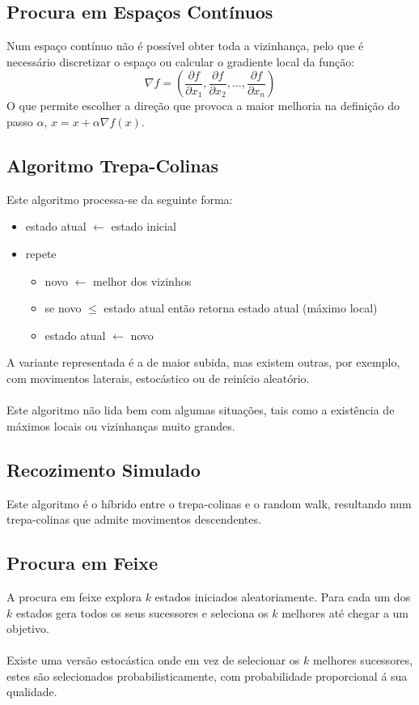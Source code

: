 \documentclass[10pt,a4paper]{report}
\begin{document}
\subsection{Procura em Espaços Contínuos}
Num espaço contínuo não é possível obter toda a vizinhança, pelo que é necessário discretizar o espaço ou calcular o gradiente local da função:
$$
\nabla f = \left( \frac{\partial f}{\partial x_1}, \frac{\partial f}{\partial x_2}, ..., \frac{\partial f}{\partial x_n} \right)
$$
O que permite escolher a direção que provoca a maior melhoria na definição do passo $\alpha$, $x = x + \alpha \nabla f (x)$.
\subsection{Algoritmo Trepa-Colinas}
Este algoritmo processa-se da seguinte forma:
\begin{itemize}
\item estado atual $\leftarrow$ estado inicial
\item repete
\begin{itemize}
\item novo $\leftarrow$ melhor dos vizinhos
\item se novo $\leq$ estado atual então retorna estado atual (máximo local)
\item estado atual $\leftarrow$ novo
\end{itemize}
\end{itemize}
A variante representada é a de maior subida, mas existem outras, por exemplo, com movimentos laterais, estocástico ou de reinício aleatório.\\
\\
Este algoritmo não lida bem com algumas situações, tais como a existência de máximos locais ou vizinhanças muito grandes.
\subsection{Recozimento Simulado}
Este algoritmo é o híbrido entre o trepa-colinas e o random walk, resultando num trepa-colinas que admite movimentos descendentes.
\subsection{Procura em Feixe}
A procura em feixe explora $k$ estados iniciados aleatoriamente. Para cada um dos $k$ estados gera todos os seus sucessores e seleciona os $k$ melhores até chegar a um objetivo.\\
\\
Existe uma versão estocástica onde em vez de selecionar os $k$ melhores sucessores, estes são selecionados probabilisticamente, com probabilidade proporcional á sua qualidade.
\end{document}
